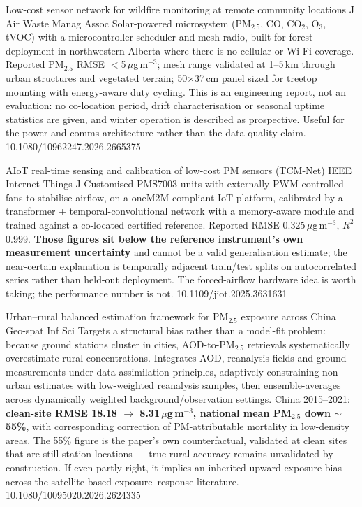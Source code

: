 \documentclass[10pt]{article}
\begin{document}
{Low-cost sensor network for wildfire monitoring at remote community locations}
{J Air Waste Manag Assoc}
{Solar-powered microsystem (PM$_{2.5}$, CO, CO$_2$, O$_3$, tVOC) with a microcontroller
scheduler and mesh radio, built for forest deployment in northwestern Alberta where there
is no cellular or Wi-Fi coverage. Reported PM$_{2.5}$ RMSE $<$5\,$\mu$g\,m$^{-3}$; mesh
range validated at 1--5\,km through urban structures and vegetated terrain;
50$\times$37\,cm panel sized for treetop mounting with energy-aware duty cycling. This is
an engineering report, not an evaluation: no co-location period, drift characterisation
or seasonal uptime statistics are given, and winter operation is described as
prospective. Useful for the power and comms architecture rather than the data-quality
claim.}
{10.1080/10962247.2026.2665375}

{AIoT real-time sensing and calibration of low-cost PM sensors (TCM-Net)}
{IEEE Internet Things J}
{Customised PMS7003 units with externally PWM-controlled fans to stabilise airflow, on a
oneM2M-compliant IoT platform, calibrated by a transformer + temporal-convolutional
network with a memory-aware module and trained against a co-located certified reference.
Reported RMSE 0.325\,$\mu$g\,m$^{-3}$, $R^2$ 0.999. \textbf{Those figures sit below the
reference instrument's own measurement uncertainty} and cannot be a valid generalisation
estimate; the near-certain explanation is temporally adjacent train/test splits on
autocorrelated series rather than held-out deployment. The forced-airflow hardware idea
is worth taking; the performance number is not.}
{10.1109/jiot.2025.3631631}


{Urban--rural balanced estimation framework for PM$_{2.5}$ exposure across China}
{Geo-spat Inf Sci}
{Targets a structural bias rather than a model-fit problem: because ground stations
cluster in cities, AOD-to-PM$_{2.5}$ retrievals systematically overestimate rural
concentrations. Integrates AOD, reanalysis fields and ground measurements under
data-assimilation principles, adaptively constraining non-urban estimates with
low-weighted reanalysis samples, then ensemble-averages across dynamically weighted
background/observation settings. China 2015--2021: \textbf{clean-site RMSE 18.18
$\rightarrow$ 8.31\,$\mu$g\,m$^{-3}$, national mean PM$_{2.5}$ down $\sim$55\%}, with
corresponding correction of PM-attributable mortality in low-density areas. The 55\%
figure is the paper's own counterfactual, validated at clean sites that are still station
locations --- true rural accuracy remains unvalidated by construction. If even partly
right, it implies an inherited upward exposure bias across the satellite-based
exposure--response literature.}
{10.1080/10095020.2026.2624335}
\end{document}
